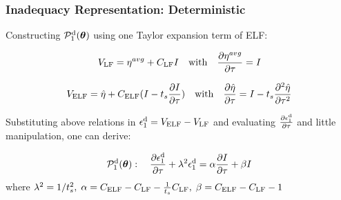 \documentclass[10pt,xcolor=dvipsnames,compress]{beamer}
\begin{document}
\begin{frame}
\frametitle{Inadequacy Representation: Deterministic}
\vfill


Constructing $\mathcal{P}_1^{\rm d}(\boldsymbol{\theta})$ using one Taylor expansion term of ELF: 

\begin{equation*}
V_{\rm LF} = {\eta}^{avg} + C_{\rm LF} I
\quad {\rm with} \quad 
\frac{\partial{{\eta}^{avg}}}{\partial\tau} = I
\end{equation*}

\begin{equation*}
V_{\rm ELF} = \hat{\eta} + C_{\rm ELF} (
I - t_s \frac{\partial I}{\partial \tau}
)
\quad {\rm with} \quad 
\frac{\partial{\hat{\eta}}}{\partial\tau} = I - t_s  \frac{\partial^2{\hat{\eta}}}{\partial\tau^2}
\end{equation*}

Substituting above relations in $\epsilon_1^{\rm d} = V_{\rm ELF}- V_{\rm LF}$ and evaluating $\frac{\partial\epsilon_1^{\rm d}}{\partial\tau}$ and little manipulation, one can derive:

\begin{block}{}

\begin{equation*}
\mathcal{P}_1^{\rm d}(\boldsymbol{\theta}) : \quad
\frac{\partial\epsilon_1^{\rm d}}{\partial\tau} + \lambda^2\epsilon_1^{\rm d} = \alpha \frac{\partial I}{\partial\tau} + \beta I
\end{equation*}
where $
\lambda^2 = 1/t_s^2, \;
\alpha = C_{\rm ELF} - C_{\rm LF} - \frac{1}{t_s}C_{\rm LF}, \; 
\beta = C_{\rm ELF} - C_{\rm LF} -1
$

\end{block}

\vfill
\end{frame}
\end{document}
